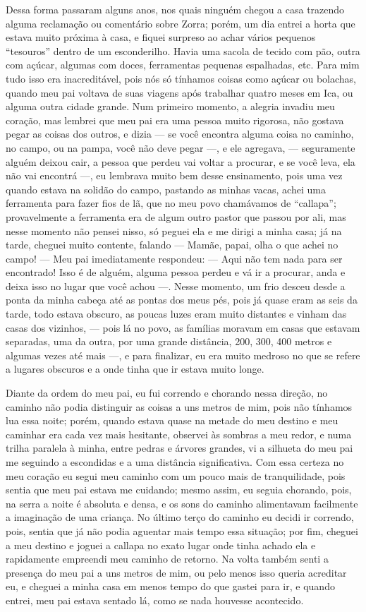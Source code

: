 Dessa forma passaram alguns anos, nos quais ninguém chegou a casa trazendo alguma reclamação ou comentário sobre Zorra; porém, um dia entrei a horta que estava muito próxima à casa, e fiquei surpreso ao achar vários pequenos ``tesouros'' dentro de um esconderilho. Havia uma sacola de tecido com pão, outra com açúcar, algumas com doces, ferramentas pequenas espalhadas, etc. 
Para mim tudo isso era inacreditável, pois nós só tínhamos coisas como açúcar ou bolachas, quando meu pai voltava de suas viagens após trabalhar quatro meses em Ica, ou alguma outra cidade grande.
Num primeiro momento, a alegria invadiu meu coração, mas lembrei que meu pai era uma pessoa muito rigorosa, não gostava pegar as coisas dos outros, e dizia --- se você encontra alguma coisa no caminho, no campo, ou na pampa, você não deve pegar ---, e ele agregava, --- seguramente alguém deixou cair, a pessoa que perdeu vai voltar a procurar, e se você leva, ela não vai encontrá ---, 
eu lembrava muito bem desse ensinamento, pois uma vez quando estava na solidão do campo, pastando as minhas vacas, achei uma ferramenta para fazer fios de lã, que no meu povo chamávamos de ``callapa''; provavelmente a ferramenta era de algum outro pastor que passou por ali, mas nesse momento não pensei nisso, só peguei ela e me dirigi a minha casa; já na tarde, cheguei  muito contente, falando --- Mamãe, papai, olha o que achei no campo! --- 
Meu pai imediatamente respondeu: --- Aqui não tem nada para ser encontrado! Isso é de alguém, alguma pessoa perdeu e vá ir a procurar, anda e deixa isso no lugar que você achou ---. 
Nesse momento, um frio desceu desde a ponta da minha cabeça até as pontas dos meus pés, pois já quase eram as seis da tarde, todo estava obscuro, as poucas luzes eram muito distantes e vinham das casas dos vizinhos, --- pois lá no povo, as famílias moravam em casas que estavam separadas, uma da outra, por uma grande distância, 200, 300, 400 metros e algumas vezes até mais  ---, e para finalizar, eu era muito medroso no que se refere a lugares obscuros e a onde tinha que ir estava muito longe.

Diante da ordem do meu pai, eu fui correndo e chorando nessa direção, no caminho não podia distinguir as coisas a uns metros de mim, pois não tínhamos lua essa noite; porém, quando estava quase na metade do meu destino e meu caminhar era cada vez mais hesitante, observei às sombras a meu redor, e numa trilha paralela à minha, entre pedras e árvores grandes, vi a silhueta do meu pai me seguindo a escondidas e a uma distância significativa.
Com essa certeza no meu coração eu segui meu caminho com um pouco mais de tranquilidade, pois sentia que meu pai estava me cuidando; mesmo assim, eu seguia chorando, pois, na serra a noite é absoluta e densa, e os sons do caminho alimentavam facilmente a imaginação de uma criança.
No último terço do caminho eu decidi ir correndo, pois, sentia que já não podia aguentar mais tempo essa situação; por fim, cheguei a meu destino e joguei a callapa no exato lugar onde tinha achado ela e rapidamente empreendi meu caminho de retorno.
Na volta também senti a presença do meu pai a uns metros de mim, ou pelo menos isso queria acreditar eu, e cheguei a minha casa em menos tempo do que gastei para ir, e quando entrei, meu pai estava sentado lá, como se nada houvesse acontecido.


